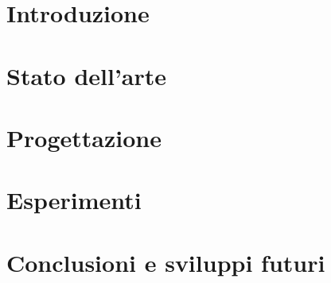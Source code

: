 \documentclass[final,a4paper]{book}
\begin{document}


\clearpage



\chapter {Introduzione}\label{chap:chap_1}


\chapter {Stato dell'arte}\label{chap:chap_2}


\chapter {Progettazione}\label{chap:chap_3}


\chapter {Esperimenti}\label{chap:chap_4}


\chapter*{Conclusioni e sviluppi futuri}






%
\clearpage
\vspace*{6cm}

\end{document}
